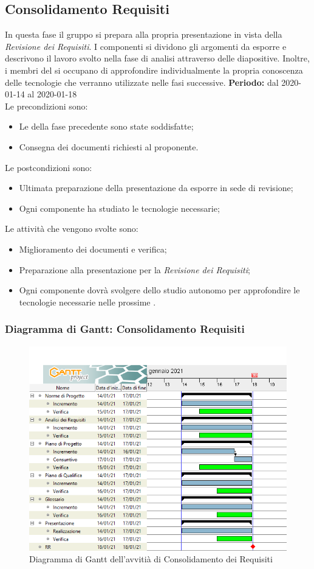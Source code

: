 \subsection{Consolidamento Requisiti}
\label{consolidamento_requisiti}
In questa fase il gruppo si prepara alla propria presentazione in vista della \textit{Revisione dei Requisiti}.
I componenti si dividono gli argomenti da esporre e descrivono il lavoro svolto nella fase di analisi attraverso delle diapositive.
Inoltre, i membri del  si occupano di approfondire individualmente la propria conoscenza delle tecnologie che verranno utilizzate nelle fasi successive.
\textbf{Periodo:} dal 2020-01-14 al 2020-01-18\\

Le precondizioni sono:
\begin{itemize}
    \item Le  della fase precedente sono state soddisfatte;
    \item Consegna dei documenti richiesti al proponente.
\end{itemize}
Le postcondizioni sono:
\begin{itemize}
    \item Ultimata preparazione della presentazione da esporre in sede di revisione;
    \item Ogni componente ha studiato le tecnologie necessarie;
\end{itemize}
	
Le attività che vengono svolte sono:
\begin{itemize}
    \item Miglioramento dei documenti e verifica;
    \item Preparazione alla presentazione per la \textit{Revisione dei Requisiti};
    \item Ogni componente dovrà svolgere dello studio autonomo per approfondire le tecnologie necessarie nelle prossime .  
\end{itemize}

\subsubsection{Diagramma di Gantt: Consolidamento Requisiti}
\begin{figure}[ht]
    \centering
    \includegraphics[width=\textwidth]{../../Immagini/Consolidamento.png}
    \caption{Diagramma di Gantt dell'avvitià di Consolidamento dei Requisiti}
\end{figure}
